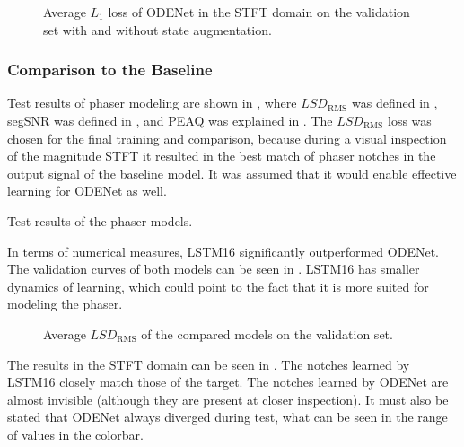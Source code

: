\begin{figure}
    \centering
    
    \caption{Average $L_1$ loss of ODENet in the \ac{STFT} domain on the validation set with and without state augmentation.}
    \label{fig:state_augmentation}
\end{figure}

\subsubsection{Comparison to the Baseline}

Test results of phaser modeling are shown in , where $LSD_\text{RMS}$ was defined in , \ac{segSNR} was defined in , and \ac{PEAQ} was explained in . The $LSD_\text{RMS}$  loss was chosen for the final training and comparison, because during a visual inspection of the magnitude \ac{STFT} it resulted in the best match of phaser notches in the output signal of the baseline model. It was assumed that it would enable effective learning for ODENet as well.

\begin{table}[]
    \caption{Test results of the phaser models.}
    \centering
    
    \label{tab:phaser_results}
\end{table}

In terms of numerical measures, \ac{LSTM}16 significantly outperformed ODENet. The validation curves of both models can be seen in . \ac{LSTM}16 has smaller dynamics of learning, which could point to the fact that it is more suited for modeling the phaser.

\begin{figure}
    \centering
    
    \caption{Average $LSD_\text{RMS}$ of the compared models on the validation set.}
    \label{fig:phaser_lstm_vs_fe}
\end{figure}

The results in the \ac{STFT} domain can be seen in . The notches learned by \ac{LSTM}16 closely match those of the target. The notches learned by ODENet are almost invisible (although they are present at closer inspection). It must also be stated that ODENet always diverged during test, what can be seen in the range of values in the colorbar.

